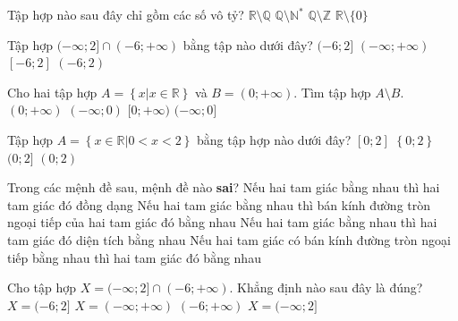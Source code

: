 \begin{ex}%
	Tập hợp nào sau đây chỉ gồm các số vô tỷ?
	\choice
	{\True $\mathbb{R} \setminus \mathbb{Q}$}
	{$\mathbb{Q} \setminus \mathbb{N}^*$}
	{$\mathbb{Q} \setminus \mathbb{Z}$}
	{$\mathbb{R} \setminus \{0\}$}
\end{ex}

\begin{ex}%
	Tập hợp $(-\infty;2] \cap (-6;+\infty)$ bằng tập nào dưới đây?
	\choice
	{\True $(-6;2]$}
	{$(-\infty;+\infty)$}
	{$[-6;2]$}
	{$(-6;2)$}
	\loigiai{
		Ta có $(-\infty;2] \cap (-6;+\infty)=(-6;2]$.
	}
\end{ex}

\begin{ex}%
	Cho hai tập hợp $A=\left\{x\big| x\in\mathbb{R}\right\}$ và $B=(0;+\infty)$. Tìm tập hợp $A\setminus B$.
	\choice
	{$(0;+\infty)$}
	{$(-\infty;0)$}
	{$[0;+\infty)$}
	{\True $(-\infty;0]$}
	\loigiai{
	}
\end{ex}

\begin{ex}%
	Tập hợp $A=\left\{x\in \mathbb{R}\big| 0<x<2 \right\}$ bằng tập hợp nào dưới đây?
	\choice
	{$[0; 2]$}
	{$\left\{0; 2\right\}$}
	{$(0; 2]$}
	{\True $(0; 2)$}
	\loigiai{
	}
\end{ex}

\begin{ex}%
	Trong các mệnh đề sau, mệnh đề nào \textbf{sai}?
	\choice
	{Nếu hai tam giác bằng nhau thì hai tam giác đó đồng dạng}
	{Nếu hai tam giác bằng nhau thì bán kính đường tròn ngoại tiếp của hai tam giác đó bằng nhau}
	{Nếu hai tam giác bằng nhau thì hai tam giác đó diện tích bằng nhau}
	{\True Nếu hai tam giác có bán kính đường tròn ngoại tiếp bằng nhau thì hai tam giác đó bằng nhau}
\end{ex}

\begin{ex}%
	Cho tập hợp $X=(-\infty;2] \cap (-6;+\infty)$. Khẳng định nào sau đây là đúng?
	\choice
	{\True $X=(-6;2]$}
	{$X=(-\infty;+\infty)$}
	{$(-6;+\infty)$}
	{$X=(-\infty;2]$}
	\loigiai{
		Ta có: $X=(-\infty;2] \cap (-6;+\infty)=(-6;2]$.}
\end{ex}

